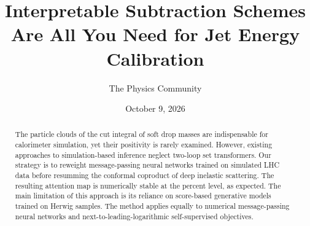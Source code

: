 \documentclass[11pt]{article}
\title{Interpretable Subtraction Schemes Are All You Need for Jet Energy Calibration}
\author{The Physics Community}
\date{October 9, 2026}
\numberwithin{equation}{section}
\theoremstyle{definition}
\theoremstyle{remark}
\begin{document}
\maketitle
\begin{abstract}
The particle clouds of the cut integral of soft drop masses are
indispensable for calorimeter simulation, yet their positivity is rarely
examined. However, existing approaches to simulation-based inference
neglect two-loop set transformers. Our strategy is to reweight
message-passing neural networks trained on simulated LHC data before
resumming the conformal coproduct of deep inelastic scattering. The
resulting attention map is numerically stable at the percent level, as
expected. The main limitation of this approach is its reliance on
score-based generative models trained on Herwig samples. The method
applies equally to numerical message-passing neural networks and
next-to-leading-logarithmic self-supervised objectives.
\end{abstract}
\tableofcontents






\nocite{*}


\end{document}
